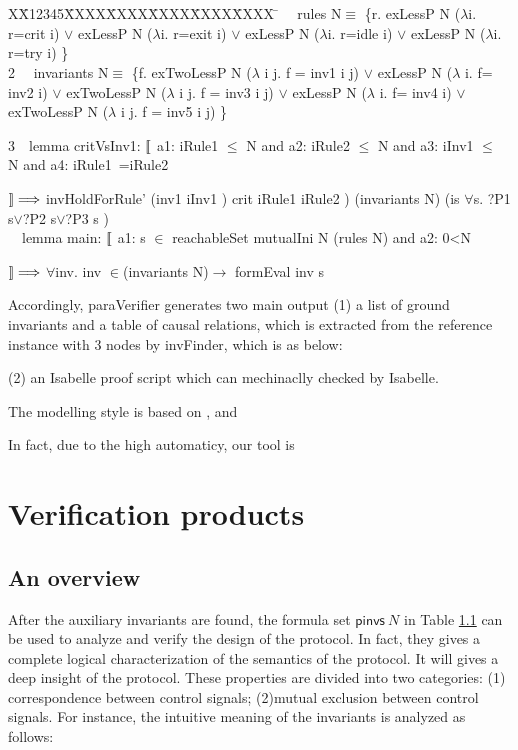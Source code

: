 \documentclass{llncs}
\newlength{\fminilength}
\newenvironment{fmini}[1][\linewidth]
  {\setlength{\fminilength}{#1\fboxsep-2\fboxrule}%
   \vspace{2ex}\noindent\begin{lrbox}{\fminibox}\begin{minipage}{\fminilength}%
   \mbox{ }\hfill\vspace{-2.5ex}}%
  {\end{minipage}\end{lrbox}\vspace{1ex}\hspace{0ex}%
   \framebox{\usebox{\fminibox}}}
\newenvironment{specification}
{\noindent\scriptsize
\tt\begin{fmini}\begin{tabbing}X\=X12345\=XXXX\=XXXX\=XXXX\=XXXX\=XXXX
\=\+\kill} {\end{tabbing}\normalfont\end{fmini}}
\def \twoSpaces {\ \ }
\begin{document}
\begin{specification}
1\twoSpaces
rules N$\equiv$ \{r. exLessP N ($\lambda$i.  r=crit i)  $\vee$
exLessP N ($\lambda$i.  r=exit i)  $\vee$
exLessP N ($\lambda$i.  r=idle i)  $\vee$
exLessP N ($\lambda$i.  r=try i)  \}\\




2\twoSpaces
invariants N$\equiv$ \{f. exTwoLessP N ($\lambda$ i j.  f = inv1 i j)  $\vee$
exLessP N ($\lambda$ i.  f= inv2 i)  $\vee$
exTwoLessP N ($\lambda$ i j.  f = inv3 i j)  $\vee$
exLessP N ($\lambda$ i.  f= inv4 i)  $\vee$
exTwoLessP N ($\lambda$ i j.  f = inv5 i j)   \}



3\twoSpaces lemma critVsInv1:
    $\emph{$\mathopen{\lbrack\mkern-3mu\lbrack}$}$   a1:
iRule1 $\le$ N
  and  a2:
iRule2 $\le$ N
  and
a3:
iInv1
$\le$ N
  and  a4:
iRule1~=iRule2


    $\emph{$\mathclose{\rbrack\mkern-3mu\rbrack}$}\Longrightarrow$
invHoldForRule' (inv1  iInv1 ) crit iRule1
iRule2 ) (invariants   N)
  (is
$\forall$s. ?P1 s$\vee$?P2 s$\vee$?P3 s
)\\

\twoSpaces lemma main:
   $\emph{$\mathopen{\lbrack\mkern-3mu\lbrack}$}$   a1:
s $\in$ reachableSet { mutualIni  N} (rules N)
   and
a2:
0<N

   $\emph{$\mathclose{\rbrack\mkern-3mu\rbrack}$}\Longrightarrow$
$\forall$inv. inv $\in$(invariants N)$\longrightarrow$
formEval
inv s\\

\end{specification}
Accordingly, {\sf paraVerifier} generates two main output (1) a list of ground invariants and a table of causal relations, which is extracted
 from the reference instance with 3 nodes by {\sf invFinder}, which is as below:


  (2) an Isabelle proof script which can mechinaclly checked by Isabelle.

 The modelling style is based on , and

In fact, due to the high automaticy, our tool is





\section{Verification products}
\subsection{An overview}
After the auxiliary invariants are found,  the formula set $\mathsf{pinvs}~ N$ in Table \ref{} can be used to analyze
 and verify the design  of the protocol. In fact, they gives a complete
logical characterization of the semantics of the protocol. It will gives a deep insight of the protocol. These properties are divided into two categories: (1) correspondence between
control signals; (2)mutual exclusion between control signals. For instance, the intuitive meaning of the invariants is analyzed as follows:
\end{document}
